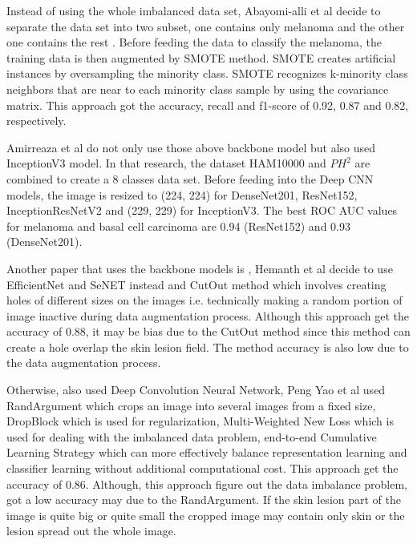 \documentclass[sensors,article,submit,pdftex,moreauthors]{Definitions/mdpi}
\begin{document}
{		Instead of using the whole imbalanced data set, Abayomi-alli et al decide to separate the data set into two subset, one contains only melanoma and the other one contains the rest \mbox{\cite{2101.133}}. Before feeding the data to classify the melanoma, the training data is then augmented by SMOTE method. SMOTE creates artificial instances by oversampling the minority class. SMOTE recognizes k-minority class neighbors that are near to each minority class sample by using the covariance matrix. This approach got the accuracy, recall and f1-score of 0.92, 0.87 and 0.82, respectively.
		
		Amirreaza et al \mbox{\cite{10348}} do not only use those above backbone model but also used InceptionV3 \mbox{\cite{00567}} model. In that research, the dataset HAM10000 and $PH^2$ are combined to create a 8 classes data set. Before feeding into the Deep CNN models, the image is resized to (224, 224) for DenseNet201, ResNet152, InceptionResNetV2 and (229, 229) for InceptionV3. The best ROC AUC values for melanoma and basal cell carcinoma are 0.94 (ResNet152) and 0.93 (DenseNet201).
		
		Another paper that uses the backbone models is \mbox{\cite{09418}}, Hemanth et al decide to use EfficientNet \mbox{\cite{11946}} and SeNET \mbox{\cite{01507}} instead and CutOut \mbox{\cite{04552v2}} method which involves creating holes of different sizes on the images i.e. technically making a random portion of image inactive during data augmentation process. Although this approach get the accuracy of 0.88, it may be bias due to the CutOut method since this method can create a hole overlap the skin lesion field. The method accuracy is also low due to the data augmentation process. 
		
		Otherwise, \mbox{\cite{01284}} also used Deep Convolution Neural Network, Peng Yao et al used RandArgument which crops an image into several images from a fixed size, DropBlock which is used for regularization, Multi-Weighted New Loss which is used for dealing with the imbalanced data problem, end-to-end Cumulative Learning Strategy which can more effectively balance representation learning and classifier learning without additional computational cost. This approach get the accuracy of 0.86. Although, this approach figure out the data imbalance problem, got a low accuracy may due to the RandArgument. If the skin lesion part of the image is quite big or quite small the cropped image may contain only skin or the lesion spread out the whole image. 
		
}
\end{document}
